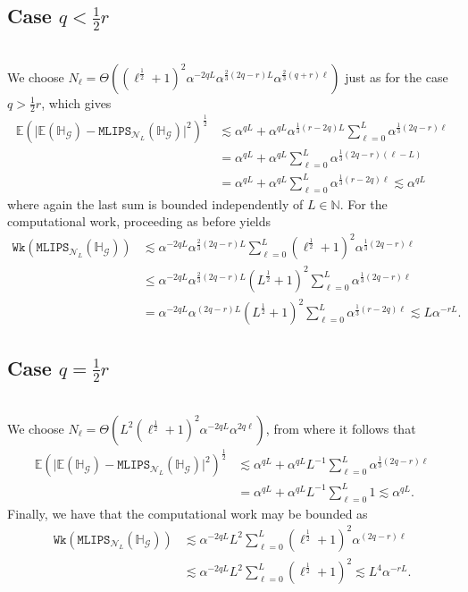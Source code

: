 \documentclass{article}
\newcommand{\cG}{\mathcal{G}}
\newcommand{\cN}{\mathcal{N}}
\newcommand{\IE}{\mathbb{E}}
\newcommand{\IH}{\mathbb{H}}
\newcommand{\IN}{\mathbb{N}}
\newcommand{\mlmk}[2]{\mathtt{MLIPS}_{#1}{\left(#2\right)}}
\newcommand{\work}[1]{\mathtt{Wk}\!\left(#1\right)}
\theoremstyle{definition}
\begin{document}
\subsection{Case $q<\frac{1}{2}r$}~\\
We choose $N_\ell=\Theta((\ell^{\frac{1}{2}}+1)^2\alpha^{-2qL}\alpha^{\frac{2}{3}(2q-r)L}\alpha^{\frac{2
  }{3}(q+r)\ell})$ just as for the case $q>\frac{1}{2}r$, which gives
\begin{align*}
  \IE\left(\vert\IE(\IH_{\cG})-\mlmk{\cN_L}{\IH_{\cG}}\vert^2\right)^{\frac{1}{2}}
  &\lesssim\alpha^{qL}+
    \alpha^{qL}\alpha^{\frac{1}{3}(r-2q)L}\sum\limits_{\ell=0}^L\alpha^{\frac{1}{3}(2q-r)\ell}\\
  &=\alpha^{qL}+
    \alpha^{qL}\sum\limits_{\ell=0}^L\alpha^{\frac{1}{3}(2q-r)(\ell-L)}\\
  &=\alpha^{qL}+
    \alpha^{qL}\sum\limits_{\ell=0}^L\alpha^{\frac{1}{3}(r-2q)\ell}
    \lesssim \alpha^{qL}
\end{align*}
where again the last sum is bounded independently of $L\in\IN$. For the computational work, proceeding as before yields
\begin{align*}
  \work{\mlmk{\cN_L}{\IH_\cG}}
  &\lesssim \alpha^{-2qL}\alpha^{\frac{2}{3}(2q-r)L}\sum\limits_{\ell=0}^{L}(\ell^{\frac{1}{2}}+1)^2\alpha^{\frac{1}{3}(2q-r)\ell}\\
  &\leq \alpha^{-2qL}\alpha^{\frac{2}{3}(2q-r)L}(L^{\frac{1}{2}}+1)^2\sum\limits_{\ell=0}^{L}\alpha^{\frac{1}{3}(2q-r)\ell}\\
  &= \alpha^{-2qL}\alpha^{(2q-r)L}(L^{\frac{1}{2}}+1)^2\sum\limits_{\ell=0}^{L}\alpha^{\frac{1}{3}(r-2q)\ell}\lesssim L\alpha^{-rL}.
\end{align*}
\subsection{Case $q=\frac{1}{2}r$}~\\
We choose $N_\ell=\Theta(L^2(\ell^{\frac{1}{2}}+1)^2\alpha^{-2qL}\alpha^{2q\ell})$, from where it follows that
\begin{align*}
  \IE\left(\vert\IE(\IH_{\cG})-\mlmk{\cN_L}{\IH_{\cG}}\vert^2\right)^{\frac{1}{2}}
  &\lesssim\alpha^{qL}+
    \alpha^{qL}L^{-1}\sum\limits_{\ell=0}^L\alpha^{\frac{1}{3}(2q-r)\ell}\\
  &=\alpha^{qL}+
    \alpha^{qL}L^{-1}\sum\limits_{\ell=0}^L1\lesssim \alpha^{qL}.
\end{align*}
Finally, we have that the computational work may be bounded as
\begin{align*}
  \work{\mlmk{\cN_L}{\IH_\cG}}
  &\lesssim \alpha^{-2qL}L^2\sum\limits_{\ell=0}^{L}(\ell^{\frac{1}{2}}+1)^2\alpha^{(2q-r)\ell}\\
  &\lesssim \alpha^{-2qL}L^2\sum\limits_{\ell=0}^{L}(\ell^{\frac{1}{2}}+1)^2\lesssim L^4
    \alpha^{-rL}.
\end{align*}
\end{document}
